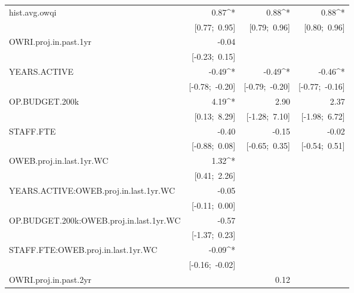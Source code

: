 \begin{table}
\begin{center}
\begin{tabular}{l D{.}{.}{5.11}@{} D{.}{.}{5.11}@{} D{.}{.}{5.11}@{} }
hist.avg.owqi                           & 0.87^{*}        & 0.88^{*}        & 0.88^{*}        \\
                                        & [0.77;\ 0.95]   & [0.79;\ 0.96]   & [0.80;\ 0.96]   \\
OWRI.proj.in.past.1yr                   & -0.04           &                 &                 \\
                                        & [-0.23;\ 0.15]  &                 &                 \\
YEARS.ACTIVE                            & -0.49^{*}       & -0.49^{*}       & -0.46^{*}       \\
                                        & [-0.78;\ -0.20] & [-0.79;\ -0.20] & [-0.77;\ -0.16] \\
OP.BUDGET.200k                          & 4.19^{*}        & 2.90            & 2.37            \\
                                        & [0.13;\ 8.29]   & [-1.28;\ 7.10]  & [-1.98;\ 6.72]  \\
STAFF.FTE                               & -0.40           & -0.15           & -0.02           \\
                                        & [-0.88;\ 0.08]  & [-0.65;\ 0.35]  & [-0.54;\ 0.51]  \\
OWEB.proj.in.last.1yr.WC                & 1.32^{*}        &                 &                 \\
                                        & [0.41;\ 2.26]   &                 &                 \\
YEARS.ACTIVE:OWEB.proj.in.last.1yr.WC   & -0.05           &                 &                 \\
                                        & [-0.11;\ 0.00]  &                 &                 \\
OP.BUDGET.200k:OWEB.proj.in.last.1yr.WC & -0.57           &                 &                 \\
                                        & [-1.37;\ 0.23]  &                 &                 \\
STAFF.FTE:OWEB.proj.in.last.1yr.WC      & -0.09^{*}       &                 &                 \\
                                        & [-0.16;\ -0.02] &                 &                 \\
OWRI.proj.in.past.2yr                   &                 & 0.12            &                 \\

\end{tabular}
\end{center}
\end{table}
